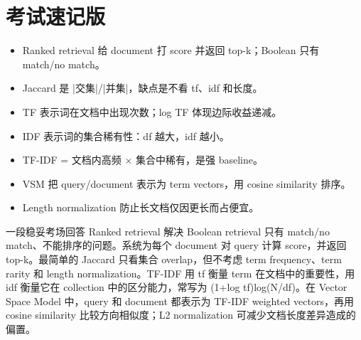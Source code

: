 \documentclass[11pt,a4paper]{ctexart}
\begin{document}
\section{考试速记版}
\begin{itemize}
\item Ranked retrieval 给 document 打 score 并返回 top-k；Boolean 只有 match/no match。
\item Jaccard 是 |交集|/|并集|，缺点是不看 tf、idf 和长度。
\item TF 表示词在文档中出现次数；log TF 体现边际收益递减。
\item IDF 表示词的集合稀有性：df 越大，idf 越小。
\item TF-IDF = 文档内高频 \(\times\) 集合中稀有，是强 baseline。
\item VSM 把 query/document 表示为 term vectors，用 cosine similarity 排序。
\item Length normalization 防止长文档仅因更长而占便宜。
\end{itemize}
\begin{callout}{一段稳妥考场回答}
Ranked retrieval 解决 Boolean retrieval 只有 match/no match、不能排序的问题。系统为每个 document 对 query 计算 score，并返回 top-k。最简单的 Jaccard 只看集合 overlap，但不考虑 term frequency、term rarity 和 length normalization。TF-IDF 用 tf 衡量 term 在文档中的重要性，用 idf 衡量它在 collection 中的区分能力，常写为 (1+log tf)log(N/df)。在 Vector Space Model 中，query 和 document 都表示为 TF-IDF weighted vectors，再用 cosine similarity 比较方向相似度；L2 normalization 可减少文档长度差异造成的偏置。
\end{callout}
\end{document}
